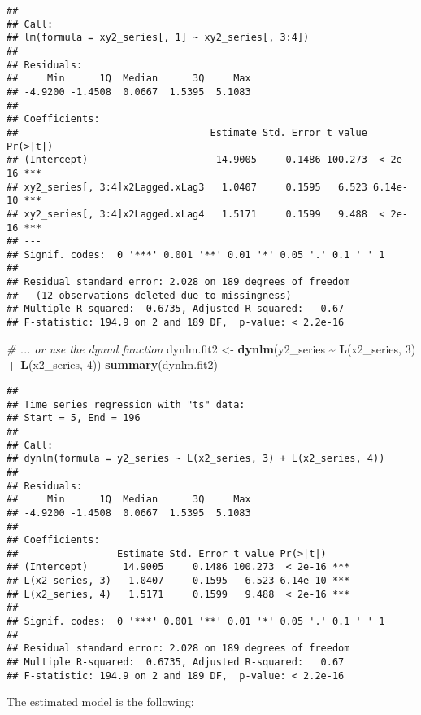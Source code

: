 \documentclass[
]{article}
\newenvironment{Shaded}{\begin{snugshade}}{\end{snugshade}}
\newcommand{\CommentTok}[1]{\textcolor[rgb]{0.56,0.35,0.01}{\textit{#1}}}
\newcommand{\DecValTok}[1]{\textcolor[rgb]{0.00,0.00,0.81}{#1}}
\newcommand{\FunctionTok}[1]{\textcolor[rgb]{0.13,0.29,0.53}{\textbf{#1}}}
\newcommand{\NormalTok}[1]{#1}
\newcommand{\OtherTok}[1]{\textcolor[rgb]{0.56,0.35,0.01}{#1}}
\newcommand{\SpecialCharTok}[1]{\textcolor[rgb]{0.81,0.36,0.00}{\textbf{#1}}}
\begin{document}
\begin{verbatim}
## 
## Call:
## lm(formula = xy2_series[, 1] ~ xy2_series[, 3:4])
## 
## Residuals:
##     Min      1Q  Median      3Q     Max 
## -4.9200 -1.4508  0.0667  1.5395  5.1083 
## 
## Coefficients:
##                                 Estimate Std. Error t value Pr(>|t|)    
## (Intercept)                      14.9005     0.1486 100.273  < 2e-16 ***
## xy2_series[, 3:4]x2Lagged.xLag3   1.0407     0.1595   6.523 6.14e-10 ***
## xy2_series[, 3:4]x2Lagged.xLag4   1.5171     0.1599   9.488  < 2e-16 ***
## ---
## Signif. codes:  0 '***' 0.001 '**' 0.01 '*' 0.05 '.' 0.1 ' ' 1
## 
## Residual standard error: 2.028 on 189 degrees of freedom
##   (12 observations deleted due to missingness)
## Multiple R-squared:  0.6735, Adjusted R-squared:   0.67 
## F-statistic: 194.9 on 2 and 189 DF,  p-value: < 2.2e-16
\end{verbatim}

\begin{Shaded}
\begin{Highlighting}[]
\CommentTok{\# ... or use the dynml function}
\NormalTok{dynlm.fit2 }\OtherTok{\textless{}{-}} \FunctionTok{dynlm}\NormalTok{(y2\_series }\SpecialCharTok{\textasciitilde{}} \FunctionTok{L}\NormalTok{(x2\_series, }\DecValTok{3}\NormalTok{) }\SpecialCharTok{+} \FunctionTok{L}\NormalTok{(x2\_series, }\DecValTok{4}\NormalTok{))}
\FunctionTok{summary}\NormalTok{(dynlm.fit2)}
\end{Highlighting}
\end{Shaded}

\begin{verbatim}
## 
## Time series regression with "ts" data:
## Start = 5, End = 196
## 
## Call:
## dynlm(formula = y2_series ~ L(x2_series, 3) + L(x2_series, 4))
## 
## Residuals:
##     Min      1Q  Median      3Q     Max 
## -4.9200 -1.4508  0.0667  1.5395  5.1083 
## 
## Coefficients:
##                 Estimate Std. Error t value Pr(>|t|)    
## (Intercept)      14.9005     0.1486 100.273  < 2e-16 ***
## L(x2_series, 3)   1.0407     0.1595   6.523 6.14e-10 ***
## L(x2_series, 4)   1.5171     0.1599   9.488  < 2e-16 ***
## ---
## Signif. codes:  0 '***' 0.001 '**' 0.01 '*' 0.05 '.' 0.1 ' ' 1
## 
## Residual standard error: 2.028 on 189 degrees of freedom
## Multiple R-squared:  0.6735, Adjusted R-squared:   0.67 
## F-statistic: 194.9 on 2 and 189 DF,  p-value: < 2.2e-16
\end{verbatim}

The estimated model is the following:
\end{document}
